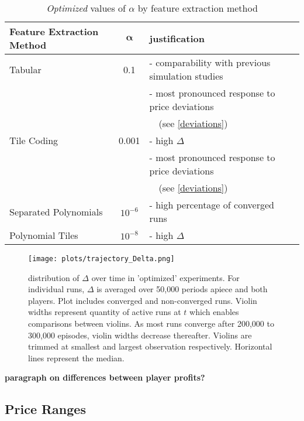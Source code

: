 \begin{center}
	\begin{table}
		
		\begin{tabular}{|l|c|l|}
			\hline
			\textbf{Feature Extraction Method}&$\boldsymbol{\alpha}$&\textbf{justification} \\
			\hline
			Tabular&0.1&- comparability with previous simulation studies \\
			&&- most pronounced response to price deviations \\
			&& \ \ (see \autoref{deviations}) \\
			\hline
			Tile Coding&0.001&- high $\Delta$ \\
			&&- most pronounced response to price deviations \\
			&&\ \ (see \autoref{deviations}) \\
			\hline
			Separated Polynomials&$10^{-6}$&- high percentage of converged runs \\
			\hline
			Polynomial Tiles&$10^{-8}$&- high $\Delta$ \\
			\hline
		\end{tabular}
		\caption{\emph{Optimized} values of $\alpha$ by feature extraction method}
		\label{justifications}
	\end{table}
\end{center}


\begin{figure}
	\texttt{[image: plots/trajectory\_Delta.png]}
	\caption{distribution of $\Delta$ over time in 'optimized' experiments. For individual runs, $\Delta$ is averaged over 50,000 periods apiece and both players. Plot includes converged and non-converged runs. Violin widths represent quantity of active runs at $t$ which enables comparisons between violins. As most runs converge after 200,000 to 300,000 episodes, violin widths decrease thereafter. Violins are trimmed at smallest and largest observation respectively. Horizontal lines represent the median.}
	\label{trajectory_Delta}
\end{figure}

\textbf{paragraph on differences between player profits?}

\subsection{Price Ranges}\label{prices}

